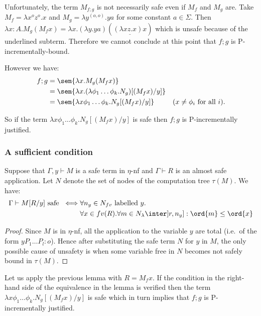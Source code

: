  

Unfortunately, the term $M_{f;g}$ is not necessarily safe even if $M_f$ and $M_g$ are. Take $M_f = \lambda x^o z^o.x$ and
$M_g = \lambda y^{(o,o)} . y a$ for some constant $a\in \Sigma$.
Then $\lambda x:A . M_g (M_f x) = \lambda x . (\lambda y . y a) ( \underline{(\lambda x z.x) x} )$ which is unsafe because of the underlined subterm. Therefore we cannot conclude at this point that $f;g$ is P-incrementally-bound.

However we have:
\begin{align*}
f;g &= \sem{\lambda x . M_g (M_f x)} \\
 &= \sem{\lambda x . (\lambda \phi_1\ldots \phi_k . N_g) [(M_f x) / y]} \\
&= \sem{\lambda x \phi_1 \dots \phi_k. N_g [(M_f x) / y]}
& \mbox{($x\neq\phi_i$ for all $i$)}.
\end{align*}

So if the term  $\lambda x \phi_1 \dots \phi_k. N_g [(M_f x) / y]$ is safe then $f;g$ is P-incrementally justified.

\subsubsection{A sufficient condition}
\begin{lemma}
Suppose that $\Gamma,y \vdash M$ is a safe term in $\eta$-nf and $\Gamma \vdash R$ is an almost safe application. Let $N$ denote the set of nodes of the computation tree $\tau(M)$. We have:
\begin{align*}
\Gamma \vdash M[R/y] \mbox{ safe } 
\iff& \forall n_y \in N_{fv} \mbox{ labelled $y$}. \\
  &\forall x \in fv(R) . \forall m \in N_{\lambda} \inter ]r,n_y] : \ord{m} \leq \ord{x}
\end{align*}
\end{lemma}
\begin{proof}
Since $M$ is in $\eta$-nf, all the application to the variable $y$ are total (i.e.~of the form $y P_1 \ldots P_l :o$). Hence after substituting the safe term $N$ for $y$ in $M$, the only possible cause of unsafety is when
some variable free in $N$ becomes not safely bound in $\tau(M)$.
\end{proof}

Let us apply the previous lemma with $R= M_f x$. If the condition in the right-hand side of the equivalence in the lemma is verified then the term  $\lambda x \phi_1 \dots \phi_k. N_g [(M_f x) / y]$ is safe which in turn implies that $f;g$ is P-incrementally justified.

